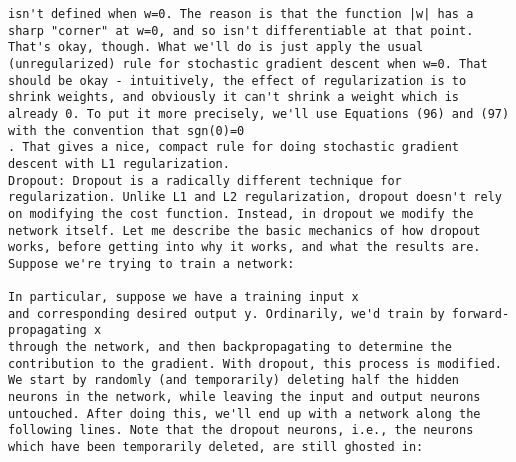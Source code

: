 \begin{lstlisting}
isn't defined when w=0. The reason is that the function |w| has a sharp "corner" at w=0, and so isn't differentiable at that point. That's okay, though. What we'll do is just apply the usual (unregularized) rule for stochastic gradient descent when w=0. That should be okay - intuitively, the effect of regularization is to shrink weights, and obviously it can't shrink a weight which is already 0. To put it more precisely, we'll use Equations (96) and (97) with the convention that sgn(0)=0
. That gives a nice, compact rule for doing stochastic gradient descent with L1 regularization.
Dropout: Dropout is a radically different technique for regularization. Unlike L1 and L2 regularization, dropout doesn't rely on modifying the cost function. Instead, in dropout we modify the network itself. Let me describe the basic mechanics of how dropout works, before getting into why it works, and what the results are.
Suppose we're trying to train a network:

In particular, suppose we have a training input x
and corresponding desired output y. Ordinarily, we'd train by forward-propagating x
through the network, and then backpropagating to determine the contribution to the gradient. With dropout, this process is modified. We start by randomly (and temporarily) deleting half the hidden neurons in the network, while leaving the input and output neurons untouched. After doing this, we'll end up with a network along the following lines. Note that the dropout neurons, i.e., the neurons which have been temporarily deleted, are still ghosted in:


\end{lstlisting}
